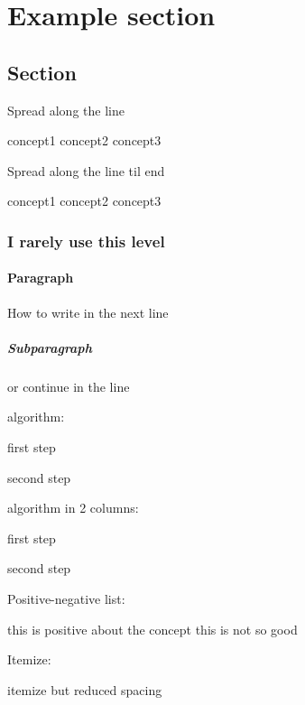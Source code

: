 
%
%
%

\section{Example section}

\subsection{Section}
Spread along the line

concept1
\hfil
concept2
\hfil
concept3

Spread along the line til end

concept1
\hfill
concept2
\hfill
concept3

\subsubsection{I rarely use this level}

\paragraph{Paragraph}\mbox{}

How to write in the next line

\subparagraph{Subparagraph}
or continue in the line

algorithm:
\begin{algo}
	\item first step
	\item second step
\end{algo}

algorithm in 2 columns:
\begin{algo2c}
	\item first step
	\item second step
\end{algo2c}

Positive-negative list:
\begin{posNeg}
	\PNpos this is positive about the concept
	\PNneg this is not so good
\end{posNeg}

Itemize:
\begin{itemm}
	\item itemize but reduced spacing
\end{itemm}
